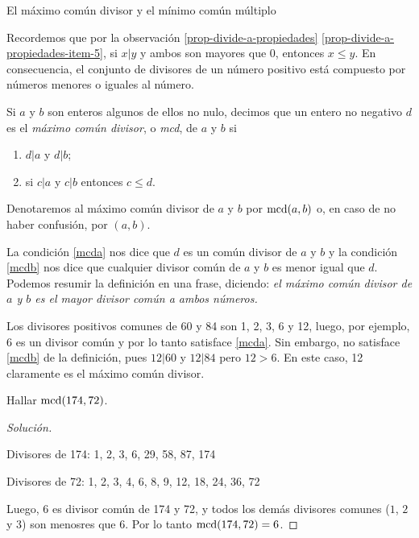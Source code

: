 \begin{section}{El máximo común divisor y el mínimo común múltiplo}\label{seccion-maximo-comun-divisor-mcm}

Recordemos que  por la observación \ref{prop-divide-a-propiedades} \ref{prop-divide-a-propiedades-item-5},  si $x|y$  y ambos son mayores que $0$,  entonces $x \le y$. En consecuencia, el conjunto de divisores de un número positivo está compuesto por números menores o iguales al número. 

\begin{definicion}\label{mcd} Si $a$ y $b$ son enteros algunos de ellos no nulo, decimos que un entero no negativo $d$ es el \textit{máximo común divisor}, o \textit{mcd}, de $a$ y $b$ si
\begin{enumerate}[label=\textit{\alph*)}]
\item\label{mcda} $ d|a$  y $d|b$;
\item\label{mcdb}  si $ c|a $ y $c|b$ entonces $ c \le d$.
\end{enumerate}
Denotaremos al máximo común divisor  de $a$ y $b$ por $\operatorname{mcd}(a,b)$ o, en caso de no haber confusión, por $(a,b)$.
\end{definicion}
 

La condición \ref{mcda} nos dice que $d$ es un común divisor de $a$ y $b$ y la condición \ref{mcdb} nos dice que cualquier divisor común de
$a$ y $b$ es menor igual que $d$. Podemos resumir la definición en una frase, diciendo: \textit{el máximo común divisor de $a$ y $b$  es el mayor divisor común a ambos números.} 

\begin{ejemplo*} \label{ejem-1-mcd}
    Los divisores positivos comunes de 60  y 84 son 1, 2, 3, 6 y 12, luego, por ejemplo, 6  es un divisor común y por lo tanto satisface \ref{mcda}. Sin embargo, no satisface \ref{mcdb} de la definición, pues $12|60$ y $12|84$ pero $12>6$. En este caso, 12  claramente es  el  máximo común divisor.
\end{ejemplo*}

\begin{ejemplo*} Hallar   $\operatorname{mcd}(174,72)$.
    \begin{proof}[Solución] ${^{}}$
        
        Divisores de 174: 1, 2, 3, 6, 29, 58, 87, 174
        
        Divisores de 72: 1, 2, 3, 4, 6, 8, 9, 12, 18, 24, 36, 72 
        
        Luego, $6$ es divisor común de 174 y 72, y todos los demás divisores comunes ($1$, $2$ y $3$) son menosres que  $6$. Por lo tanto $\operatorname{mcd}(174,72) =6$.
    \end{proof}
\end{ejemplo*}


\end{section}
